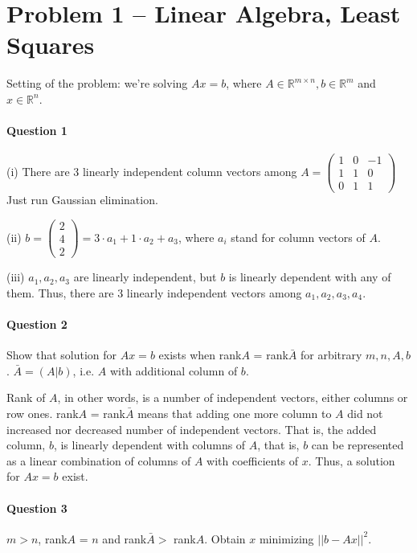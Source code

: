 \section{Problem 1 – Linear Algebra, Least Squares}
Setting of the problem: we're solving $Ax = b$, where $A\in \mathbb{R}^{m\times n}, b\in\mathbb{R}^m$ and $x\in \mathbb{R}^n$.

\paragraph{Question 1}
(i) There are 3 linearly independent column vectors among
$A = \begin{pmatrix}
1 & 0 & -1\\
1 & 1 & 0 \\
0 & 1 & 1
\end{pmatrix}$
Just run Gaussian elimination.

(ii) $b = \begin{pmatrix}
2 \\ 4\\ 2
\end{pmatrix}
= 3\cdot a_1 + 1\cdot a_2 + a_3
$,
where $a_i$ stand for column vectors of $A$.

(iii) $a_1, a_2, a_3$ are linearly independent, but $b$ is linearly dependent with any of them.
Thus, there are 3 linearly independent vectors among $a_1, a_2, a_3, a_4$.

\paragraph{Question 2}
Show that solution for $Ax= b$ exists when rank$A$ = rank$\bar{A}$ for arbitrary $m,n, A, b$. 
$\bar{A} = (A | b)$, i.e. $A$ with additional column of $b$.

Rank of $A$, in other words, is a number of independent vectors, either columns or row ones.
rank$A$ = rank$\bar{A}$ means that adding one more column to $A$ did not increased nor decreased number of independent vectors.
That is, the added column, $b$, is linearly dependent with columns of $A$,
that is, $b$ can be represented as a linear combination of columns of $A$ with coefficients of $x$.
Thus, a solution for $Ax = b$ exist.


\paragraph{Question 3}
$m>n$, rank$A$ = $n$ and rank$\bar{A} >$ rank$A$. 
Obtain $x$ minimizing $||b - Ax||^2$.
 
